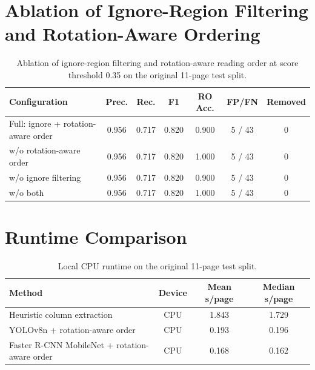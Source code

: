 \documentclass[pdflatex,sn-mathphys-num]{sn-jnl}
\begin{document}
\section{Ablation of Ignore-Region Filtering and Rotation-Aware Ordering}

\begin{table}[t]
\centering
\scriptsize\setlength{\tabcolsep}{3pt}
\caption{Ablation of ignore-region filtering and rotation-aware reading order at score threshold 0.35 on the original 11-page test split.}
\begin{tabular}{lcccccc}
\toprule
Configuration & Prec. & Rec. & F1 & RO Acc. & FP/FN & Removed \\
\midrule
Full: ignore + rotation-aware order & 0.956 & 0.717 & 0.820 & 0.900 & 5 / 43 & 0 \\
w/o rotation-aware order & 0.956 & 0.717 & 0.820 & 1.000 & 5 / 43 & 0 \\
w/o ignore filtering & 0.956 & 0.717 & 0.820 & 0.900 & 5 / 43 & 0 \\
w/o both & 0.956 & 0.717 & 0.820 & 1.000 & 5 / 43 & 0 \\
\bottomrule
\end{tabular}
\end{table}

\section{Runtime Comparison}

\begin{table}[t]
\centering
\scriptsize\setlength{\tabcolsep}{3pt}
\caption{Local CPU runtime on the original 11-page test split.}
\begin{tabular}{lccc}
\toprule
Method & Device & Mean s/page & Median s/page \\
\midrule
Heuristic column extraction & CPU & 1.843 & 1.729 \\
YOLOv8n + rotation-aware order & CPU & 0.193 & 0.196 \\
Faster R-CNN MobileNet + rotation-aware order & CPU & 0.168 & 0.162 \\
\bottomrule
\end{tabular}
\end{table}
\end{document}
